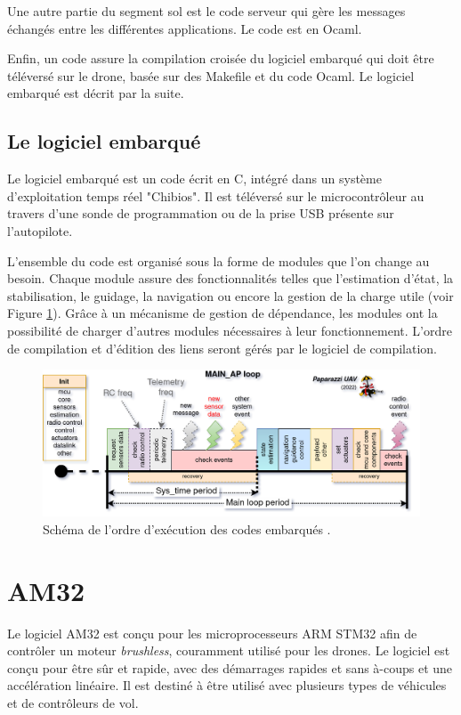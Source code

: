 Une autre partie du segment sol est le code serveur qui gère les messages échangés entre les différentes applications. Le code est en Ocaml.

Enfin, un code assure la compilation croisée du logiciel embarqué qui doit être téléversé sur le drone, basée sur des Makefile et du code Ocaml. Le logiciel embarqué est décrit par la suite.

 \subsection*{Le logiciel embarqué}
 Le logiciel embarqué est un code écrit en C, intégré dans un système d'exploitation temps réel "Chibios". Il est téléversé sur le microcontrôleur au travers d'une sonde de programmation ou de la prise USB présente sur l'autopilote.

 L'ensemble du code est organisé sous la forme de modules que l'on change au besoin. Chaque module assure des fonctionnalités telles que l'estimation d'état, la stabilisation, le guidage, la navigation ou encore la gestion de la charge utile (voir Figure \ref{fig:schedulingpaparazzi}). Grâce à un mécanisme de gestion de dépendance, les modules ont la possibilité de charger d'autres modules nécessaires à leur fonctionnement. L'ordre de compilation et d'édition des liens seront gérés par le logiciel de compilation.


 \begin{figure}[ht!]
    \centerline{
    \includegraphics[trim=0cm 0cm 0cm 0cm,clip,width=0.7\columnwidth]{figures/PPRZ_Main_ap_loop.png}}
    \caption{Schéma de l'ordre d'exécution des codes embarqués \cite{RTDpaparazzi2022}.}
    \label{fig:schedulingpaparazzi}
\end{figure}

 
\section*{AM32}
Le logiciel AM32 est conçu pour les microprocesseurs ARM STM32 afin de contrôler un moteur \textit{brushless}, couramment utilisé pour les drones. Le logiciel est conçu pour être sûr et rapide, avec des démarrages rapides et sans à-coups et une accélération linéaire. Il est destiné à être utilisé avec plusieurs types de véhicules et de contrôleurs de vol. 

